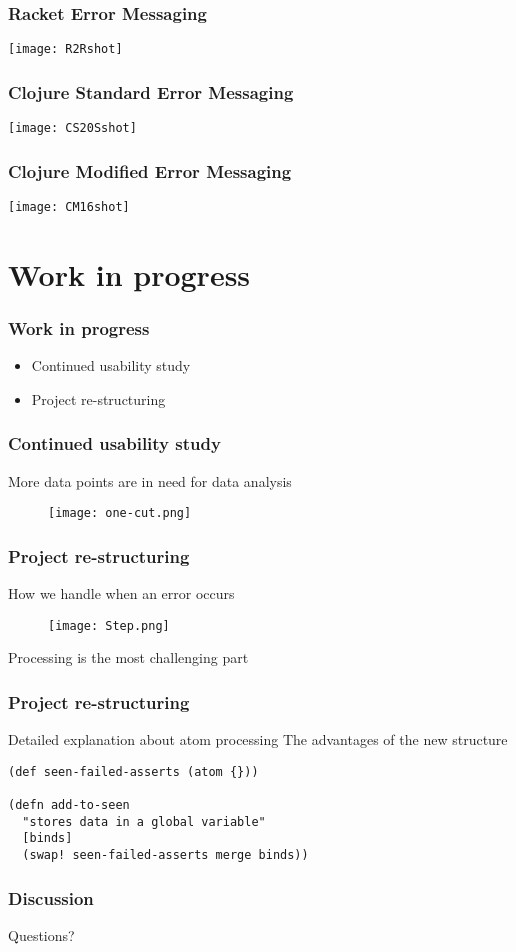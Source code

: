 \documentclass{beamer}
\begin{document}
\begin{frame}
  \frametitle{Racket Error Messaging}
  \texttt{[image: R2Rshot]}
\end{frame}

\begin{frame}
  \frametitle{Clojure Standard Error Messaging}
  \texttt{[image: CS20Sshot]}
\end{frame}

\begin{frame}
  \frametitle{Clojure Modified Error Messaging}
  \texttt{[image: CM16shot]}
\end{frame}




\section{Work in progress}

\begin{frame}
  \frametitle{Work in progress}
\begin{itemize}
\item Continued usability study 
\item Project re-structuring
\end{itemize}
\end{frame}

\begin{frame}
  \frametitle{Continued usability study }
More data points are in need for data analysis
\begin{figure}
\texttt{[image: one-cut.png]}
\end{figure}
\end{frame}


\begin{frame}
  \frametitle{Project re-structuring}
How we handle when an error occurs 
\begin{figure}
\texttt{[image: Step.png]}
\end{figure}
\alert{Processing} is the most challenging part
\end{frame}


\begin{frame}[fragile]
  \frametitle{Project re-structuring}
Detailed explanation about atom processing
The advantages of the new structure
\begin{verbatim}
(def seen-failed-asserts (atom {}))

(defn add-to-seen
  "stores data in a global variable"
  [binds]
  (swap! seen-failed-asserts merge binds))
\end{verbatim}
\end{frame}

\begin{frame}
  \frametitle{Discussion}
Questions?
\end{frame}
\end{document}
